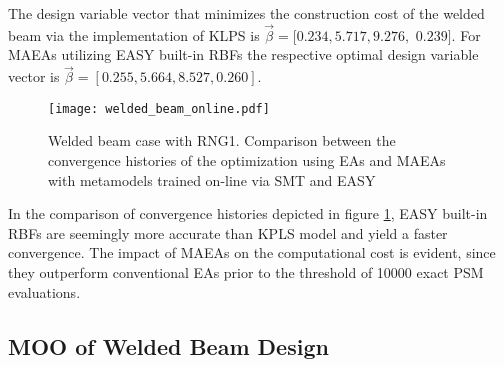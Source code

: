The design variable vector that minimizes the construction
cost of the welded beam via the implementation of KLPS is $\vec{β} 
\!= \![0.234, 5.717, 9.276,$ $0.239]$. For MAEAs utilizing EASY 
built-in RBFs the respective optimal design variable vector is 
$\vec{β} = [0.255, 5.664, 8.527, 0.260]$.
 
\begin{figure}[h!]
\centering
\texttt{[image: welded\_beam\_online.pdf]}   
\caption{Welded beam case with RNG1. Comparison between the 
convergence histories of the optimization using EAs and MAEAs 
with metamodels trained on-line via SMT and EASY} 
\label{fig:SMT_EASY_welded_beam}
\end{figure}

In the comparison of convergence histories depicted in figure 
\ref{fig:SMT_EASY_welded_beam}, EASY built-in RBFs are seemingly 
more accurate than KPLS model and yield a faster convergence. The 
impact of MAEAs on the computational cost is evident, since they 
outperform conventional EAs prior to the threshold of 10000 exact 
PSM evaluations.


\vfill

\newpage


\subsection{MOO of Welded Beam Design}

